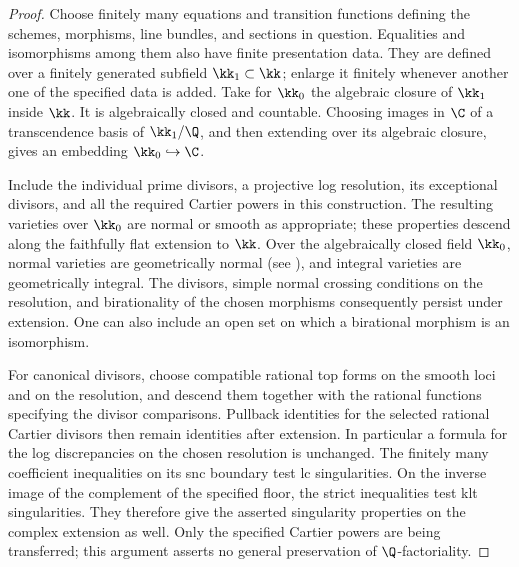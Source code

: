 \begin{proof}
Choose finitely many equations and transition functions defining
the schemes, morphisms, line bundles, and sections in question.
Equalities and isomorphisms among them also have finite
presentation data.  They are defined over a finitely generated
subfield $\kk_1\subset\kk$; enlarge it finitely whenever another
one of the specified data is added.  Take for $\kk_0$ the algebraic
closure of $\kk_1$ inside $\kk$.  It is algebraically closed and
countable.  Choosing images in $\C$ of a transcendence basis of
$\kk_1/\Q$, and then extending over its algebraic closure, gives
an embedding $\kk_0\hookrightarrow\C$.

Include the individual prime divisors, a projective log resolution,
its exceptional divisors, and all the required Cartier powers in
this construction.  The resulting varieties over $\kk_0$ are
normal or smooth as appropriate; these properties descend along
the faithfully flat extension to $\kk$.  Over the algebraically
closed field $\kk_0$, normal varieties are geometrically normal
(see \cite[Tag~0C3M]{StacksProject}), and integral varieties are
geometrically integral.  The divisors, simple normal crossing
conditions on the resolution, and birationality of the chosen
morphisms consequently persist under extension.  One can also
include an open set on which a birational morphism is an
isomorphism.

For canonical divisors, choose compatible rational top forms on
the smooth loci and on the resolution, and descend them together
with the rational functions specifying the divisor comparisons.
Pullback identities for the selected rational Cartier divisors
then remain identities after extension.  In particular a formula
for the log discrepancies on the chosen resolution is unchanged.
The finitely many coefficient inequalities on its snc boundary
test lc singularities.  On the inverse image of the complement
of the specified floor, the strict inequalities test klt
singularities.  They therefore give the asserted singularity
properties on the complex extension as well.  Only the specified
Cartier powers are being transferred; this argument asserts no
general preservation of $\Q$-factoriality.


\end{proof}
